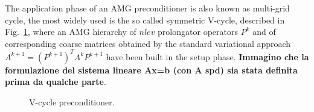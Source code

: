 The application phase of an AMG preconditioner is also known as
multi-grid cycle, the most widely used is the so called symmetric
V-cycle, described in Fig.~\ref{Vcycle}, where an AMG hierarchy of
$nlev$ prolongator operators $P^k$ and of corresponding coarse
matrices obtained by the standard variational approach
$A^{k+1}=(P^{k+1})^TA^kP^{k+1}$ have been built in the setup
phase. \textbf{Immagino che la formulazione del sistema lineare Ax=b
  (con A spd) sia stata definita prima da qualche parte}. 
\begin{figure}[t]
\begin{center}
\caption{V-cycle preconditioner.\label{Vcycle}}
\end{center}
\end{figure}

